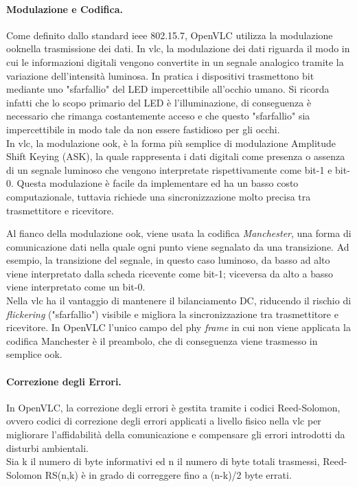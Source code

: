 \paragraph{Modulazione e Codifica.}
\noindent Come definito dallo standard \gls{ieee} 802.15.7, OpenVLC utilizza la modulazione \gls{ook}\glsfirstoccur nella trasmissione dei dati. In \gls{vlc}, la modulazione dei dati riguarda il modo in cui le informazioni digitali vengono convertite in un segnale analogico tramite la variazione dell'intensità luminosa. In pratica i dispositivi trasmettono bit mediante uno "sfarfallio" del LED impercettibile all'occhio umano. Si ricorda infatti che lo scopo primario del LED è l'illuminazione, di conseguenza è necessario che rimanga costantemente acceso e che questo "sfarfallio" sia impercettibile in modo tale da non essere fastidioso per gli occhi.\\
In \gls{vlc}, la modulazione \gls{ook}, è la forma più semplice di modulazione Amplitude Shift Keying (ASK), la quale rappresenta i dati digitali come presenza o assenza di un segnale luminoso che vengono interpretate rispettivamente come bit-1 e bit-0. Questa modulazione è facile da implementare ed ha un basso costo computazionale, tuttavia richiede una sincronizzazione molto precisa tra trasmettitore e ricevitore.

Al fianco della modulazione \gls{ook}, viene usata la codifica \textit{Manchester}, una forma di comunicazione dati nella quale ogni punto viene segnalato da una transizione. Ad esempio, la transizione del segnale, in questo caso luminoso, da basso ad alto viene interpretato dalla scheda ricevente come bit-1; viceversa da alto a basso viene interpretato come un bit-0.\\
Nella \gls{vlc} ha il vantaggio di mantenere il bilanciamento DC, riducendo il rischio di \textit{flickering} ("sfarfallio") visibile e migliora la sincronizzazione tra trasmettitore e ricevitore.
In OpenVLC l'unico campo del \gls{phy} \textit{frame} in cui non viene applicata la codifica Manchester è il preambolo, che di conseguenza viene trasmesso in semplice \gls{ook}.

\paragraph{Correzione degli Errori.}
In OpenVLC, la correzione degli errori è gestita tramite i codici Reed-Solomon, ovvero codici di correzione degli errori applicati a livello fisico nella \gls{vlc} per migliorare l'affidabilità della comunicazione e compensare gli errori introdotti da disturbi ambientali.\\
Sia k il numero di byte informativi ed n il numero di byte totali trasmessi, Reed-Solomon RS(n,k) è in grado di correggere fino a (n-k)/2 byte errati.

